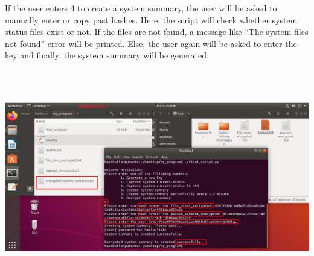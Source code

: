 \documentclass{article} %
\begin{document}
\noindent 

\noindent 

\noindent 

\noindent 

\noindent 

\noindent 

\noindent 

\noindent 

\noindent 

\noindent 

\noindent 

\noindent 

\noindent \newline\newline \newline\newline\newline \newline\newline\newline \newline\newline\newline \newline\newline\newline\newline \newline\newline\newline\newline\newline If the user enters 4 to create a system summary, the user will be asked to manually enter or copy past hashes. Here, the script will check whether system status files exist or not. If the files are not found, a message like ``The system files not found'' error will be printed. Else, the user again will be asked to enter the key and finally, the system summary will be generated. 

\noindent \includegraphics*[width=6in, height=3.70in, keepaspectratio=false]{5.png}
\end{document}
